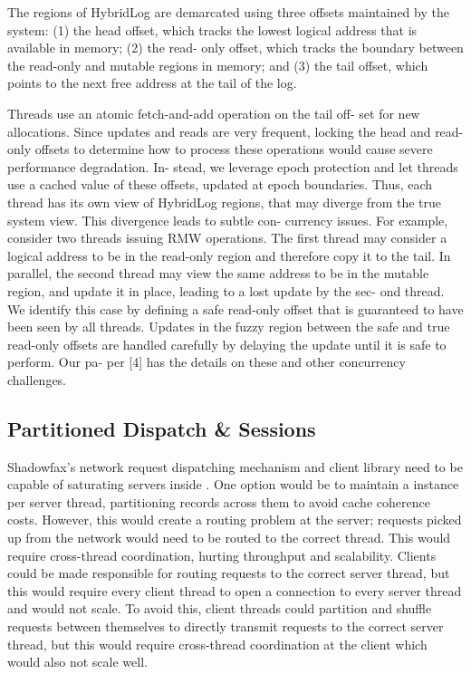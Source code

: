 {The regions of HybridLog are demarcated using three offsets maintained
by the system: (1) the head offset, which tracks the lowest logical
address that is available in memory; (2) the read- only offset, which
tracks the boundary between the read-only and mutable regions in memory;
and (3) the tail offset, which points to the next free address at the
tail of the log.

Threads use an atomic fetch-and-add operation on the tail off- set for
new allocations. Since updates and reads are very frequent, locking the
head and read-only offsets to determine how to process these operations
would cause severe performance degradation. In- stead, we leverage epoch
protection and let threads use a cached value of these offsets, updated
at epoch boundaries. Thus, each thread has its own view of HybridLog
regions, that may diverge from the true system view. This divergence
leads to subtle con- currency issues. For example, consider two threads
issuing RMW operations. The first thread may consider a logical address
to be in the read-only region and therefore copy it to the tail. In
parallel, the second thread may view the same address to be in the
mutable region, and update it in place, leading to a lost update by the
sec- ond thread. We identify this case by defining a safe read-only
offset that is guaranteed to have been seen by all threads. Updates in
the fuzzy region between the safe and true read-only offsets are handled
carefully by delaying the update until it is safe to perform. Our pa-
per [4] has the details on these and other concurrency challenges.
}
\fi

\subsection{Partitioned Dispatch \& Sessions}
\label{sec:dispatch}

Shadowfax's network request dispatching mechanism and client library need to be
capable of saturating servers inside \faster.
%
One option would be to maintain a \faster instance per server thread,
partitioning records across them to avoid cache coherence costs.
%
However, this would create a routing problem at the server; requests
picked up from the network would need to be routed to the correct thread.
%
This would require cross-thread coordination, hurting throughput and
scalability.
%
Clients could be made responsible for routing requests to the correct
server thread, but this would require every client thread to open a
connection to every server thread and would not scale.
%
To avoid this, client threads could partition and shuffle requests between
themselves to directly transmit requests to the correct server thread, but this would
require cross-thread coordination at the client which would also not scale well.

